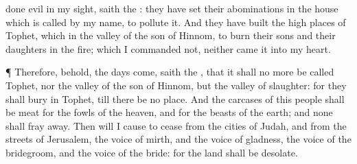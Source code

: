 {done
evil in my
sight,
saith the
{}: they have
set their
abominations in the
house which is
called by my
name, to
pollute it.
And they have
built the high
places of
Tophet, which
{} in the
valley of the
son of
Hinnom, to
burn their
sons and their
daughters in the
fire; which I
commanded
{} not, neither
came it into my
heart.
\par }{\PP {}¶ Therefore, behold, the
days
come,
saith the
{}, that it shall no more be
called
Tophet, nor the
valley of the
son of
Hinnom, but the
valley of
slaughter: for they shall
bury in
Tophet, till there be
no
place.
And the
carcases of this
people shall be
meat for the
fowls of the
heaven, and for the
beasts of the
earth; and none shall fray
{}
away.
Then will I cause to
cease from the
cities of
Judah, and from the
streets of
Jerusalem, the
voice of
mirth, and the
voice of
gladness, the
voice of the
bridegroom, and the
voice of the
bride: for the
land shall be
desolate.

}
